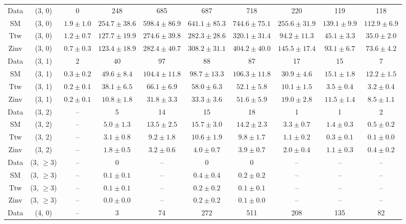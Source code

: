 \begin{table}[h!]
{\begin{tabular}{cccccccccc}
	Data & (3, 0) & 0 & 248 & 685 & 687 & 718 & 220 & 119 & 118 \\[0.5ex] 
	SM & (3, 0) & $1.9\pm 1.0$ & $254.7\pm 38.6$ & $598.4\pm 86.9$ & $641.1\pm 85.3$ & $744.6\pm 75.1$ & $255.6\pm 31.9$ & $139.1\pm 9.9$ & $112.9\pm 6.9$ \\[0.5ex] 
	Ttw & (3, 0) & $1.2\pm 0.7$ & $127.7\pm 19.9$ & $274.6\pm 39.8$ & $282.3\pm 28.6$ & $320.1\pm 31.4$ & $94.2\pm 11.3$ & $45.1\pm 3.3$ & $35.0\pm 2.0$ \\[0.5ex] 
	Zinv & (3, 0) & $0.7\pm 0.3$ & $123.4\pm 18.9$ & $282.4\pm 40.7$ & $308.2\pm 31.1$ & $404.2\pm 40.0$ & $145.5\pm 17.4$ & $93.1\pm 6.7$ & $73.6\pm 4.2$ \\[0.5ex] 
	Data & (3, 1) & 2 & 40 & 97 & 88 & 87 & 17 & 15 & 7 \\[0.5ex] 
	SM & (3, 1) & $0.3\pm 0.2$ & $49.6\pm 8.4$ & $104.4\pm 11.8$ & $98.7\pm 13.3$ & $106.3\pm 11.8$ & $30.9\pm 4.6$ & $15.1\pm 1.8$ & $12.2\pm 1.5$ \\[0.5ex] 
	Ttw & (3, 1) & $0.2\pm 0.1$ & $38.1\pm 6.5$ & $66.1\pm 6.9$ & $58.0\pm 6.3$ & $52.1\pm 5.8$ & $10.1\pm 1.5$ & $3.5\pm 0.4$ & $3.2\pm 0.4$ \\[0.5ex] 
	Zinv & (3, 1) & $0.2\pm 0.1$ & $10.8\pm 1.8$ & $31.8\pm 3.3$ & $33.3\pm 3.6$ & $51.6\pm 5.9$ & $19.0\pm 2.8$ & $11.5\pm 1.4$ & $8.5\pm 1.1$ \\[0.5ex] 
	Data & (3, 2) & -- & 5 & 14 & 15 & 18 & 1 & 1 & 2 \\[0.5ex] 
	SM & (3, 2) & -- & $5.0\pm 1.3$ & $13.5\pm 2.5$ & $15.7\pm 3.0$ & $14.2\pm 2.3$ & $3.3\pm 0.7$ & $1.4\pm 0.3$ & $0.5\pm 0.2$ \\[0.5ex] 
	Ttw & (3, 2) & -- & $3.1\pm 0.8$ & $9.2\pm 1.8$ & $10.6\pm 1.9$ & $9.8\pm 1.7$ & $1.1\pm 0.2$ & $0.3\pm 0.1$ & $0.1\pm 0.0$ \\[0.5ex] 
	Zinv & (3, 2) & -- & $1.8\pm 0.5$ & $3.2\pm 0.6$ & $4.0\pm 0.7$ & $3.9\pm 0.7$ & $2.0\pm 0.4$ & $1.1\pm 0.3$ & $0.4\pm 0.2$ \\[0.5ex] 
	Data & (3, $\ge3$) & -- & 0 & -- & 0 & 0 & -- & -- & -- \\[0.5ex] 
	SM & (3, $\ge3$) & -- & $0.1\pm 0.1$ & -- & $0.4\pm 0.4$ & $0.2\pm 0.2$ & -- & -- & -- \\[0.5ex] 
	Ttw & (3, $\ge3$) & -- & $0.1\pm 0.1$ & -- & $0.2\pm 0.2$ & $0.1\pm 0.1$ & -- & -- & -- \\[0.5ex] 
	Zinv & (3, $\ge3$) & -- & $0.0\pm 0.0$ & -- & $0.2\pm 0.2$ & $0.1\pm 0.0$ & -- & -- & -- \\[0.5ex] 
	Data & (4, 0) & -- & 3 & 74 & 272 & 511 & 208 & 135 & 82 \\[0.5ex] 

\end{tabular}}
\end{table}
